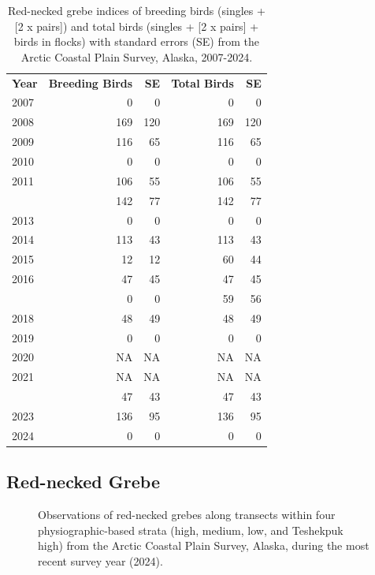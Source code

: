 \documentclass[
]{article}
\begin{document}
\begingroup\fontsize{10}{12}\selectfont

\begin{longtable}[t]{lrrrr}

\caption{\label{tbl-RNGR}Red-necked grebe indices of breeding birds
(singles + {[}2 x pairs{]}) and total birds (singles + {[}2 x pairs{]} +
birds in flocks) with standard errors (SE) from the Arctic Coastal Plain
Survey, Alaska, 2007-2024.}

\tabularnewline

\\
\toprule
\textbf{Year} & \textbf{Breeding Birds} & \textbf{SE} & \textbf{Total Birds} & \textbf{SE}\\
\midrule
2007 & 0 & 0 & 0 & 0\\
2008 & 169 & 120 & 169 & 120\\
2009 & 116 & 65 & 116 & 65\\
2010 & 0 & 0 & 0 & 0\\
2011 & 106 & 55 & 106 & 55\\
\addlinespace
2012 & 142 & 77 & 142 & 77\\
2013 & 0 & 0 & 0 & 0\\
2014 & 113 & 43 & 113 & 43\\
2015 & 12 & 12 & 60 & 44\\
2016 & 47 & 45 & 47 & 45\\
\addlinespace
2017 & 0 & 0 & 59 & 56\\
2018 & 48 & 49 & 48 & 49\\
2019 & 0 & 0 & 0 & 0\\
2020 & NA & NA & NA & NA\\
2021 & NA & NA & NA & NA\\
\addlinespace
2022 & 47 & 43 & 47 & 43\\
2023 & 136 & 95 & 136 & 95\\
2024 & 0 & 0 & 0 & 0\\
\bottomrule

\end{longtable}

\endgroup{}

\newpage{}

\subsection*{Red-necked Grebe}\label{red-necked-grebe-2}

\begin{figure}


\caption{\label{fig-RNGRmap}Observations of red-necked grebes along
transects within four physiographic-based strata (high, medium, low, and
Teshekpuk high) from the Arctic Coastal Plain Survey, Alaska, during the
most recent survey year (2024).}

\end{figure}%
\end{document}
